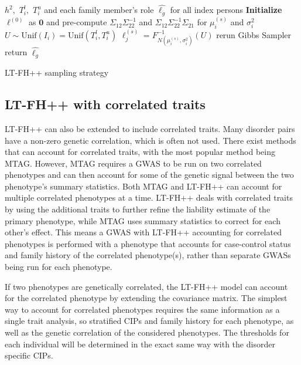 \begin{algorithm}
\begin{algorithmic}[1]
\INPUT $ h^2,$ $T_{i}^l,$ $T_{i}^u$ and each family member's role 
\OUTPUT $ \hat{\ell_g} $ for all index persons
\GIBBS
\STATE \textbf{Initialize} $\ell^{(0)}$ as $ \mathbf{0} $ and pre-compute $ \Sigma_{12} \Sigma_{22}^{-1} $ and $ \Sigma_{12} \Sigma_{22}^{-1} \Sigma_{21} $ for $ \mu_i^{(s)} $ and $ \sigma^2_i $
	  
	\STATE $ U \sim \text{Unif}(I_i) = \text{Unif}(T_i^l, T_i^u) $ 
	\STATE $ \ell_j^{(s)} = F^{-1}_{N(\mu_i^{(s)}, \sigma_i^2)}(U) $
	\ENDFOR
\ENDFOR
{}
\STATE rerun Gibbs Sampler
\ELSE
\STATE return  $ \hat{\ell_g} $
\ENDIF
\end{algorithmic}
\caption{LT-FH++ sampling strategy}
\label{alg:LTFH++}
\end{algorithm}


\subsection{LT-FH++ with correlated traits}
LT-FH++ can also be extended to include correlated traits. Many disorder pairs have a non-zero genetic correlation, which is often not used. There exist methods that can account for correlated traits, with the most popular method being MTAG\cite{turley2018multi}. However, MTAG requires a GWAS to be run on two correlated phenotypes and can then account for some of the genetic signal between the two phenotype's summary statistics. Both MTAG and LT-FH++ can account for multiple correlated phenotypes at a time. LT-FH++ deals with correlated traits by using the additional traits to further refine the liability estimate of the primary phenotype, while MTAG uses summary statistics to correct for each other's effect. This means a GWAS with LT-FH++ accounting for correlated phenotypes is performed with a phenotype that accounts for case-control status and family history of the correlated phenotype(s), rather than separate GWASs being run for each phenotype. 

If two phenotypes are genetically correlated, the LT-FH++ model can account for the correlated phenotype by extending the covariance matrix. The simplest way to account for correlated phenotypes requires the same information as a single trait analysis, so stratified CIPs and family history for each phenotype, as well as the genetic correlation of the considered phenotypes. The thresholds for each individual will be determined in the exact same way with the disorder specific CIPs.

